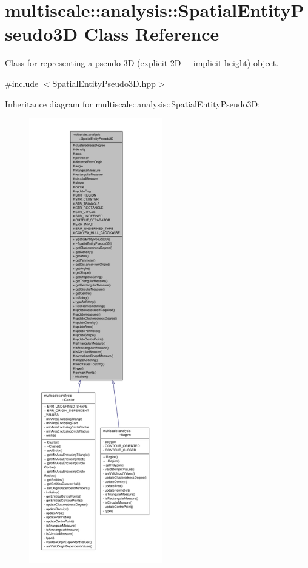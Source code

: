 \hypertarget{classmultiscale_1_1analysis_1_1SpatialEntityPseudo3D}{\section{multiscale\-:\-:analysis\-:\-:Spatial\-Entity\-Pseudo3\-D Class Reference}
\label{classmultiscale_1_1analysis_1_1SpatialEntityPseudo3D}
}


Class for representing a pseudo-\/3\-D (explicit 2\-D + implicit height) object.  




{\ttfamily \#include $<$Spatial\-Entity\-Pseudo3\-D.\-hpp$>$}



Inheritance diagram for multiscale\-:\-:analysis\-:\-:Spatial\-Entity\-Pseudo3\-D\-:\nopagebreak
\begin{figure}[H]
\begin{center}
\leavevmode
\includegraphics[height=550pt]{classmultiscale_1_1analysis_1_1SpatialEntityPseudo3D__inherit__graph}
\end{center}
\end{figure}


